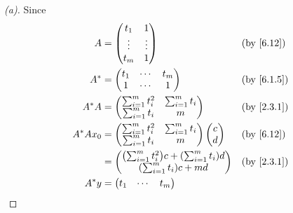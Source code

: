 \begin{proof}[(a)]
  Since
  \begin{align*}
    A         & = \begin{pmatrix}
                    t_1    & 1      \\
                    \vdots & \vdots \\
                    t_m    & 1
                  \end{pmatrix}                                                               &  & \by{6.12}    \\
    A^*       & = \begin{pmatrix}
                    t_1 & \cdots & t_m \\
                    1   & \cdots & 1
                  \end{pmatrix}                                                            &  & \by{6.1.5}      \\
    A^* A     & = \begin{pmatrix}
                    \sum_{i = 1}^m t_i^2 & \sum_{i = 1}^m t_i \\
                    \sum_{i = 1}^m t_i   & m
                  \end{pmatrix}                                     &  & \by{2.3.1}                             \\
    A^* A x_0 & = \begin{pmatrix}
                    \sum_{i = 1}^m t_i^2 & \sum_{i = 1}^m t_i \\
                    \sum_{i = 1}^m t_i   & m
                  \end{pmatrix} \begin{pmatrix}
                                  c \\
                                  d
                                \end{pmatrix}                                     &  & \by{6.12}                \\
              & = \begin{pmatrix}
                    \pa{\sum_{i = 1}^m t_i^2} c + \pa{\sum_{i = 1}^m t_i} d \\
                    \pa{\sum_{i = 1}^m t_i} c + md
                  \end{pmatrix} &  & \by{2.3.1}                 \\
    A^* y     & = \begin{pmatrix}
                    t_1 & \cdots & t_m \\

\end{pmatrix}
\end{align*}
\end{proof}
